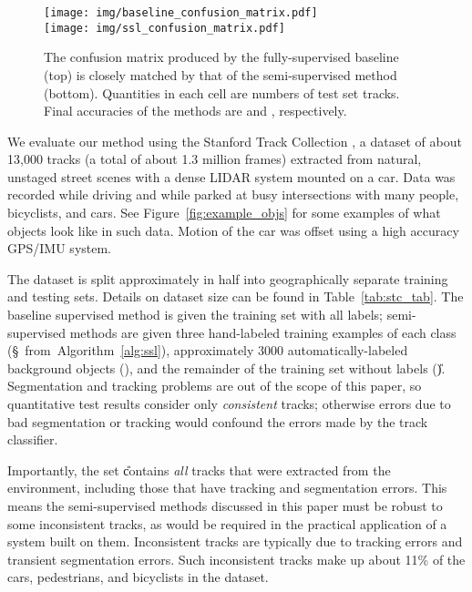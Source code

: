 \documentclass[conference]{IEEEtran}
\begin{document}
\begin{figure}
  \centering
  \texttt{[image: img/baseline\_confusion\_matrix.pdf]} \\
  \vspace{0.1in}
  \texttt{[image: img/ssl\_confusion\_matrix.pdf]}
  \caption{The confusion matrix produced by the fully-supervised baseline (top) is closely matched by that of the semi-supervised method (bottom).  Quantities in each cell are numbers of test set tracks.  Final accuracies of the methods are \protect and \protect, respectively.}
  \label{fig:conf}
\end{figure}



We evaluate our method using the Stanford Track Collection \cite{StanfordTrackCollection}, a dataset of about 13,000 tracks (a total of about 1.3 million frames) extracted from natural, unstaged street scenes with a dense LIDAR system mounted on a car.  Data was recorded while driving and while parked at busy intersections with many people, bicyclists, and cars.  See Figure~\ref{fig:example_objs} for some examples of what objects look like in such data.  Motion of the car was offset using a high accuracy GPS/IMU system.

The dataset is split approximately in half into geographically separate training and testing sets.  Details on dataset size can be found in Table~\ref{tab:stc_tab}.  The baseline supervised method is given the training set with all labels; semi-supervised methods are given three hand-labeled training examples of each class (\S~from~Algorithm~\ref{alg:ssl}), approximately 3000 automatically-labeled background objects (\B), and the remainder of the training set without labels (\U).  Segmentation and tracking problems are out of the scope of this paper, so quantitative test results consider only \textit{consistent} tracks; otherwise errors due to bad segmentation or tracking would confound the errors made by the track classifier.

Importantly, the set \U contains \textit{all} tracks that were extracted from the environment, including those that have tracking and segmentation errors.  This means the semi-supervised methods discussed in this paper must be robust to some inconsistent tracks, as would be required in the practical application of a system built on them.  Inconsistent tracks are typically due to tracking errors and transient segmentation errors.  Such inconsistent tracks make up about 11\% of the cars, pedestrians, and bicyclists in the dataset.
\end{document}

